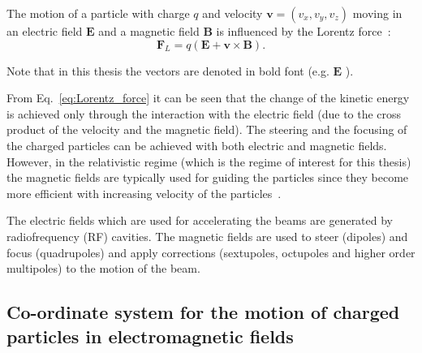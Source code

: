 
The motion of a particle with charge $q$ and velocity $\mathbf{v}=(v_x, v_y, v_z)$ moving in an electric field $\mathbf{E}$ and a magnetic field $\mathbf{B}$ is influenced by the Lorentz force~\cite{Wiedemann:1083415}: 
\begin{equation}\label{eq:Lorentz_force}
 \mathbf{F}_L = q(\mathbf{E} + \mathbf{v} \times \mathbf{B}).
\end{equation}

Note that in this thesis the vectors are denoted in bold font (e.g. $\mathbf{E}$ ). %

From Eq.~\eqref{eq:Lorentz_force} it can be seen that the change of the kinetic energy is achieved only through the interaction with the electric field (due to the cross product of the velocity and the magnetic field). The steering and the focusing of the charged particles can be achieved with both electric and magnetic fields. However, in the relativistic regime (which is the regime of interest for this thesis) the magnetic fields are typically used for guiding the particles since they become more efficient with increasing velocity of the particles~\cite{Wiedemann:1083415}.

The electric fields which are used for accelerating the beams are generated by radiofrequency (RF) cavities. The magnetic fields are used to steer (dipoles) and focus (quadrupoles) and apply corrections (sextupoles, octupoles and higher order multipoles) to the motion of the beam. %


\subsection{Co-ordinate system for the motion of charged particles in electromagnetic fields}\label{subsec:coordinate_system}

